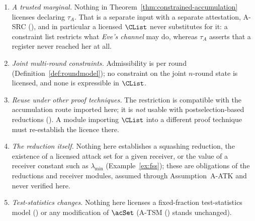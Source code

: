 \begin{remark}
\begin{enumerate}[label=(\alph*),leftmargin=2.2em]
$\acSet$ (Remark~\ref{rem:homog}\,(c)).
\item \emph{A trusted marginal.} Nothing in
Theorem~\ref{thm:constrained-accumulation} licenses declaring $\tau_A$. That
is a separate input with a separate attestation, A-SRC
(), and in particular a licensed $\CList$ never
substitutes for it: a constraint list restricts what \emph{Eve's
channel} may do, whereas $\tau_A$ asserts that a register never
reached her at all.
\item \emph{Joint multi-round constraints.} Admissibility is per round
(Definition~\ref{def:roundmodel}); no constraint on the joint
$n$-round state is licensed, and none is expressible in $\CList$.
\item \emph{Reuse under other proof techniques.} The restriction is
compatible with the accumulation route imported here; it is \emph{not}
usable with postselection-based reductions
(\cite[Rem.~9.4]{tupkary2026decoy}). A module importing $\CList$ into
a different proof technique must re-establish the licence there.
\item \emph{The reduction itself.} Nothing here establishes a
squashing reduction, the existence of a licensed attack set for a
given receiver, or the value of a receiver constant such as
$\lambda_{\min}$ (Example~\ref{ex:fss}); these are obligations of the
reductions and receiver modules, assumed through Assumption~A-ATK and never
verified here.
\item \emph{Test-statistics changes.} Nothing here licenses a
fixed-fraction test-statistics model
() or any modification of
$\acSet$ (A-TSM () stands unchanged).
\end{enumerate}
\end{remark}
